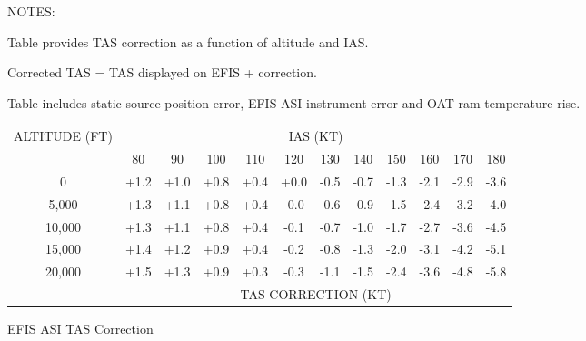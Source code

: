 \begin{figure}[t]
\begin{center}
\vspace{\perfnoteskip}
    \raggedright NOTES:
    \begin{enumerate*}
      \item Table provides TAS correction as a function of altitude and IAS.
      \item Corrected TAS = TAS displayed on EFIS + correction.
      \item Table includes static source position error, EFIS ASI instrument error and OAT ram temperature rise.
      \end{enumerate*}

\vspace{\perfnoteskip}
\settowidth{\colOne}{ALTITUDE}
\begin{tabular}{|c|c|c|c|c|c|c|c|c|c|c|c|}
\hline
\multirow{2}{\colOne}{\centering ALTITUDE (FT)}&\multicolumn{11}{c|}{IAS (KT)}\\
\cline{2-12}
&80&90&100&110&120&130&140&150&160&170&180\\
\hline
\hline
0&+1.2&+1.0&+0.8&+0.4&+0.0&-0.5&-0.7&-1.3&-2.1&-2.9&-3.6\\
\hline
5,000&+1.3&+1.1&+0.8&+0.4&-0.0&-0.6&-0.9&-1.5&-2.4&-3.2&-4.0\\
\hline
10,000&+1.3&+1.1&+0.8&+0.4&-0.1&-0.7&-1.0&-1.7&-2.7&-3.6&-4.5\\
\hline
15,000&+1.4&+1.2&+0.9&+0.4&-0.2&-0.8&-1.3&-2.0&-3.1&-4.2&-5.1\\
\hline
20,000&+1.5&+1.3&+0.9&+0.3&-0.3&-1.1&-1.5&-2.4&-3.6&-4.8&-5.8\\
\hline
&\multicolumn{11}{c|}{TAS CORRECTION (KT)}\\
\hline
\end{tabular}
\end{center}
\caption{EFIS ASI TAS Correction}
\label{EFIS-ASI-TAS-Corr}
\end{figure}

